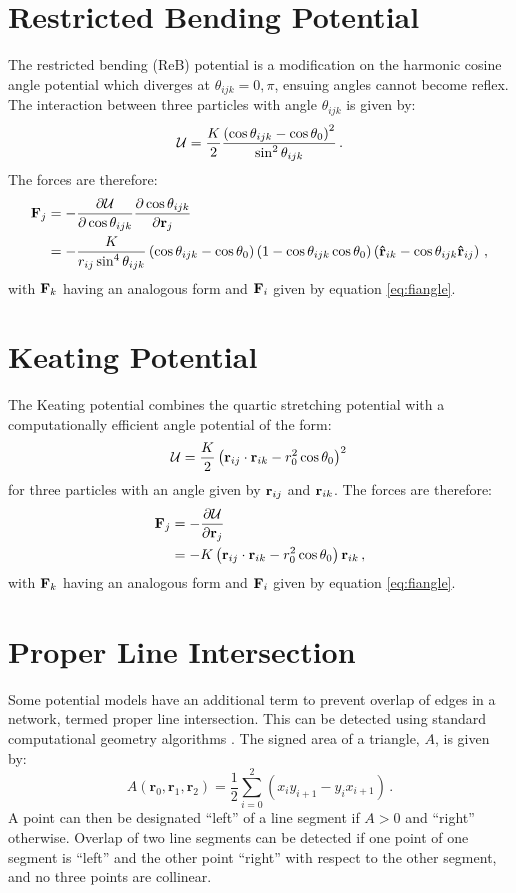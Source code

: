 \section{Restricted Bending Potential}

The restricted bending (ReB) potential is a modification on the harmonic cosine angle potential which diverges at $\theta_{ijk}=0,\pi$, ensuing angles cannot become reflex.
The interaction between three particles with angle $\theta_{ijk}$ is given by:
\begin{equation}
	\mathcal{U} = \frac{K}{2}\frac{\left(\cos\theta_{ijk}-\cos\theta_0\right)^2}{\sin^2\theta_{ijk}}\,.
\end{equation}
The forces are therefore:
\begin{align}
	\mathbf{F}_j&=-\frac{\partial \mathcal{U}}{\partial \cos\theta_{ijk}} \frac{\partial \cos\theta_{ijk}}{\partial \mathbf{r}_j} \nonumber \\ 
	&=-\frac{K}{r_{ij}\sin^4\theta_{ijk}}\left(\cos\theta_{ijk}-\cos\theta_0\right)\left(1-\cos\theta_{ijk}\cos\theta_0\right)\left(\boldsymbol{\hat{\mathbf{r}}}_{ik}-\cos\theta_{ijk}\boldsymbol{\hat{\mathbf{r}}}_{ij}\right) \,,
\end{align}
with $\mathbf{F}_k$ having an analogous form and $\mathbf{F}_i$ given by equation \eqref{eq:fiangle}.

\section{Keating Potential}

The Keating potential combines the quartic stretching potential with a computationally efficient angle potential of the form:
\begin{equation}
	\mathcal{U} = \frac{K}{2}\left(\mathbf{r}_{ij}\cdot\mathbf{r}_{ik}-r_0^2\cos\theta_0\right)^2\,
\end{equation}
for three particles with an angle given by $\mathbf{r}_{ij}$ and $\mathbf{r}_{ik}$.
The forces are therefore:
\begin{align}
	\mathbf{F}_j&=-\frac{\partial \mathcal{U}}{\partial \mathbf{r}_j} \nonumber \\ 
	&=-K\left(\mathbf{r}_{ij}\cdot\mathbf{r}_{ik}-r_0^2\cos\theta_0\right)\mathbf{r}_{ik} \,,
\end{align}
with $\mathbf{F}_k$ having an analogous form and $\mathbf{F}_i$ given by equation \eqref{eq:fiangle}.

\section{Proper Line Intersection}

Some potential models have an additional term to prevent overlap of edges in a \td{} network, termed proper line intersection.
This can be detected using standard computational geometry algorithms \cite{ORourke1998}.
The signed area of a triangle, $A$, is given by:
\begin{equation}
	A\left(\mathbf{r}_0, \mathbf{r}_1, \mathbf{r}_2\right) = \frac{1}{2}\sum_{i=0}^{2} \left(x_iy_{i+1}-y_ix_{i+1}\right)\,.
\end{equation}
A point can then be designated ``left'' of a line segment if $A>0$ and ``right'' otherwise.
Overlap of two line segments can be detected if one point of one segment is ``left'' and the other point ``right'' with respect to the other segment, and no three points are collinear.

